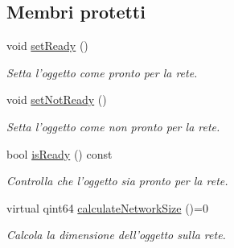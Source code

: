 \subsection*{Membri protetti}
\begin{DoxyCompactItemize}
\item 
\hypertarget{class_k_cloud_1_1_net_object_a549cd5cbde57b491e4748c17e5a04a02}{void \hyperlink{class_k_cloud_1_1_net_object_a549cd5cbde57b491e4748c17e5a04a02}{set\-Ready} ()}\label{class_k_cloud_1_1_net_object_a549cd5cbde57b491e4748c17e5a04a02}

\begin{DoxyCompactList}\small\item\em Setta l'oggetto come pronto per la rete. \end{DoxyCompactList}\item 
\hypertarget{class_k_cloud_1_1_net_object_a01ec2678e0dc68845d76115269fb58b1}{void \hyperlink{class_k_cloud_1_1_net_object_a01ec2678e0dc68845d76115269fb58b1}{set\-Not\-Ready} ()}\label{class_k_cloud_1_1_net_object_a01ec2678e0dc68845d76115269fb58b1}

\begin{DoxyCompactList}\small\item\em Setta l'oggetto come non pronto per la rete. \end{DoxyCompactList}\item 
bool \hyperlink{class_k_cloud_1_1_net_object_a93e9cf7c27cce29a0c97fc23195f4352}{is\-Ready} () const 
\begin{DoxyCompactList}\small\item\em Controlla che l'oggetto sia pronto per la rete. \end{DoxyCompactList}\item 
virtual qint64 \hyperlink{class_k_cloud_1_1_net_object_a38f65014ee542d84967d7cf829bf2d4c}{calculate\-Network\-Size} ()=0
\begin{DoxyCompactList}\small\item\em Calcola la dimensione dell'oggetto sulla rete. \end{DoxyCompactList}\end{DoxyCompactItemize}
